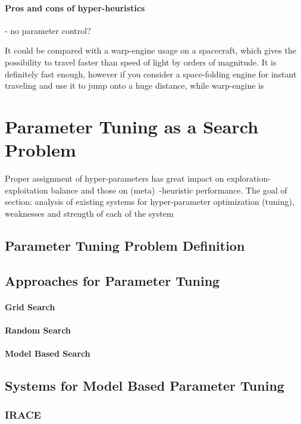 \paragraph{Pros and cons of hyper-heuristics} - no parameter control?



It could be compared with a warp-engine usage on a spacecraft, which gives the possibility to travel faster than speed of light by orders of magnitude. It is definitely fast enough, however if you consider a space-folding engine for instant traveling and use it to jump onto a huge distance, while warp-engine is 


\section{Parameter Tuning as a Search Problem}\label{bg: parameter tuning}
Proper assignment of hyper-parameters has great impact on exploration-exploitation balance and those on (meta)~-heuristic performance. 
The goal of section: analysis of existing systems for hyper-parameter optimization (tuning), weaknesses and strength of each of the system

\subsection{Parameter Tuning Problem Definition}
\subsection{Approaches for Parameter Tuning}
\paragraph{Grid Search}
\paragraph{Random Search}
\paragraph{Model Based Search}

\subsection{Systems for Model Based Parameter Tuning}\label{bg: parameter tuning expamples}

\subsubsection{IRACE}
